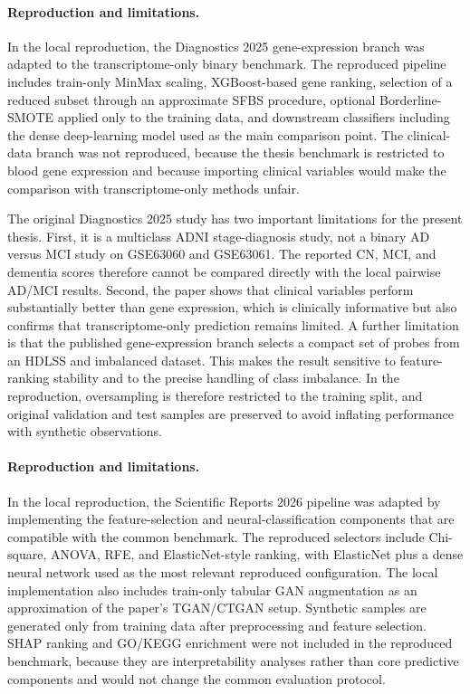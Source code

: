 \paragraph{Reproduction and limitations.}
In the local reproduction, the Diagnostics 2025 gene-expression branch was adapted to the transcriptome-only binary benchmark. The reproduced pipeline includes train-only MinMax scaling, XGBoost-based gene ranking, selection of a reduced subset through an approximate SFBS procedure, optional Borderline-SMOTE applied only to the training data, and downstream classifiers including the dense deep-learning model used as the main comparison point. The clinical-data branch was not reproduced, because the thesis benchmark is restricted to blood gene expression and because importing clinical variables would make the comparison with transcriptome-only methods unfair.

The original Diagnostics 2025 study has two important limitations for the present thesis. First, it is a multiclass ADNI stage-diagnosis study, not a binary AD versus MCI study on GSE63060 and GSE63061. The reported CN, MCI, and dementia scores therefore cannot be compared directly with the local pairwise AD/MCI results. Second, the paper shows that clinical variables perform substantially better than gene expression, which is clinically informative but also confirms that transcriptome-only prediction remains limited. A further limitation is that the published gene-expression branch selects a compact set of probes from an HDLSS and imbalanced dataset. This makes the result sensitive to feature-ranking stability and to the precise handling of class imbalance. In the reproduction, oversampling is therefore restricted to the training split, and original validation and test samples are preserved to avoid inflating performance with synthetic observations.

\paragraph{Reproduction and limitations.}
In the local reproduction, the Scientific Reports 2026 pipeline was adapted by implementing the feature-selection and neural-classification components that are compatible with the common benchmark. The reproduced selectors include Chi-square, ANOVA, RFE, and ElasticNet-style ranking, with ElasticNet plus a dense neural network used as the most relevant reproduced configuration. The local implementation also includes train-only tabular GAN augmentation as an approximation of the paper's TGAN/CTGAN setup. Synthetic samples are generated only from training data after preprocessing and feature selection. SHAP ranking and GO/KEGG enrichment were not included in the reproduced benchmark, because they are interpretability analyses rather than core predictive components and would not change the common evaluation protocol.

